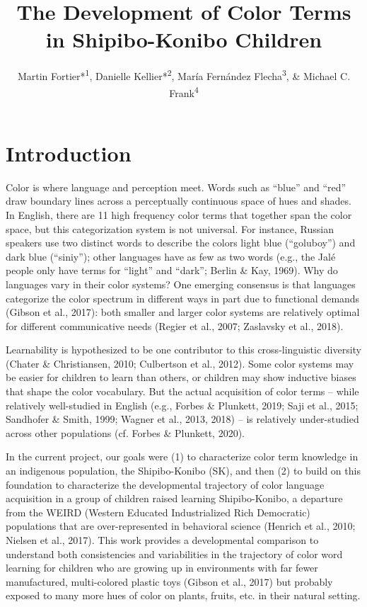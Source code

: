 \documentclass[
  ,apa7,floatsintext]{apa6}
\title{The Development of Color Terms in Shipibo-Konibo Children}
\author{Martin Fortier*\textsuperscript{1}, Danielle Kellier*\textsuperscript{2}, María Fernández Flecha\textsuperscript{3}, \& Michael C. Frank\textsuperscript{4}}
\date{}
\affiliation{\vspace{0.5cm}\textsuperscript{1} Paris Sciences et Lettres University, Paris, France\\\textsuperscript{2} University of Pennsylvania, Philadelphia, Pennsylvania, United States of America\\\textsuperscript{3} Pontificia Universidad Católica del Perú, Lima, Peru\\\textsuperscript{4} Stanford University, Stanford, California, United States of America}
\begin{document}
\maketitle

\hypertarget{introduction}{%
\section{Introduction}\label{introduction}}

Color is where language and perception meet. Words such as ``blue'' and ``red'' draw boundary lines across a perceptually continuous space of hues and shades. In English, there are 11 high frequency color terms that together span the color space, but this categorization system is not universal. For instance, Russian speakers use two distinct words to describe the colors light blue (``goluboy'') and dark blue (``siniy''); other languages have as few as two words (e.g., the Jalé people only have terms for ``light'' and ``dark''; Berlin \& Kay, 1969). Why do languages vary in their color systems? One emerging consensus is that languages categorize the color spectrum in different ways in part due to functional demands (Gibson et al., 2017): both smaller and larger color systems are relatively optimal for different communicative needs (Regier et al., 2007; Zaslavsky et al., 2018).

Learnability is hypothesized to be one contributor to this cross-linguistic diversity (Chater \& Christiansen, 2010; Culbertson et al., 2012). Some color systems may be easier for children to learn than others, or children may show inductive biases that shape the color vocabulary. But the actual acquisition of color terms -- while relatively well-studied in English (e.g., Forbes \& Plunkett, 2019; Saji et al., 2015; Sandhofer \& Smith, 1999; Wagner et al., 2013, 2018) -- is relatively under-studied across other populations (cf. Forbes \& Plunkett, 2020).

In the current project, our goals were (1) to characterize color term knowledge in an indigenous population, the Shipibo-Konibo (SK), and then (2) to build on this foundation to characterize the developmental trajectory of color language acquisition in a group of children raised learning Shipibo-Konibo, a departure from the WEIRD (Western Educated Industrialized Rich Democratic) populations that are over-represented in behavioral science (Henrich et al., 2010; Nielsen et al., 2017). This work provides a developmental comparison to understand both consistencies and variabilities in the trajectory of color word learning for children who are growing up in environments with far fewer manufactured, multi-colored plastic toys (Gibson et al., 2017) but probably exposed to many more hues of color on plants, fruits, etc. in their natural setting.
\end{document}

